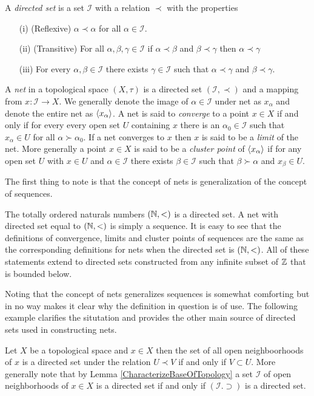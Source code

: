\begin{defn}A \emph{directed set} is a set $\mathcal{I}$ with a relation $\prec$ with the properties 
\begin{itemize}
\item[(i)] (Reflexive) $\alpha \prec \alpha$ for all $\alpha \in \mathcal{I}$.
\item[(ii)] (Transitive) For all $\alpha, \beta, \gamma \in \mathcal{I}$ if $\alpha \prec \beta$ and $\beta \prec \gamma$ then $\alpha \prec \gamma$
\item[(iii)] For every $\alpha, \beta \in \mathcal{I}$ there exists $\gamma \in \mathcal{I}$ such that
$\alpha \prec \gamma$ and $\beta \prec \gamma$.
\end{itemize}
A \emph{net} in a topological space $(X, \tau)$ is a directed set $(\mathcal{I}, \prec)$ and a mapping from
$x : \mathcal{I} \to X$.  We generally denote the image of $\alpha \in \mathcal{I}$ under net as $x_\alpha$ and denote the entire net as $\langle x_{\alpha} \rangle$.  A net is said to 
\emph{converge} to a point $x \in X$ if and only if for every every open set $U$ containing $x$ there is an $\alpha_0 \in \mathcal{I}$ such
that $x_\alpha \in U$ for all $\alpha \succ \alpha_0$.  If a net converges to $x$ then $x$ is said to be a \emph{limit} of the net.  More generally 
a point $x \in X$ is said to be a \emph{cluster point} of $\langle x_{\alpha} \rangle$ if for any open set $U$ with $x \in U$ and $\alpha \in \mathcal{I}$ there exists
$\beta \in \mathcal{I}$ such that $\beta \succ \alpha$ and $x_\beta \in U$. 
\end{defn}

The first thing to note is that the concept of nets is generalization of the concept of sequences.  
\begin{examp}The totally ordered naturals numbers $(\mathbb{N}, <)$ is a directed set.  A net with directed set equal to $(\mathbb{N}, <)$ is simply a sequence.  It is easy to see that the definitions of
convergence, limits and cluster points of sequences are the same as the corresponding definitions for nets when the directed set is $(\mathbb{N}, <)$.  All of these statements extend to directed sets constructed from any infinite subset of $\mathbb{Z}$ that is bounded below.
\end{examp}

Noting that the concept of nets generalizes sequences is somewhat comforting but in no way makes it clear why the definition in question is of use.  The following example clarifies the
situtation and provides the other main source of directed sets used in constructing nets.
\begin{examp} Let $X$ be a topological space and $x \in X$ then the set of all open neighboorhoods of $x$ is a directed set under the relation $U \prec V$ if and only if $V \subset U$.  More generally note that by Lemma \ref{CharacterizeBaseOfTopology} a set $\mathcal{I}$ of open neighborhoods of $x \in X$ is a directed set if and only if $(\mathcal{I}. \supset)$ is a directed set.
\end{examp}

